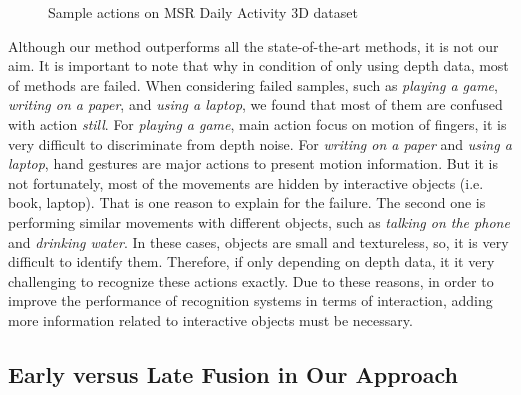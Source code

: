 \documentclass[review]{elsarticle}
\begin{document}
\begin{figure}
{        }
    \hfill
	\caption{\label{lbl:Figure_MSRDaily3D}Sample actions on MSR Daily Activity 3D dataset}
\end{figure}

Although our method outperforms all the state-of-the-art methods, it is not our aim. It is important to note that why in condition of only using depth data, most of methods are failed. When considering failed samples, such as \textit{playing a game}, \textit{writing on a paper}, and \textit{using a laptop}, we found that most of them are confused with action \textit{still}. For \textit{playing a game}, main action focus on motion of fingers, it is very difficult to discriminate from depth noise. For \textit{writing on a paper} and \textit{using a laptop}, hand gestures are major actions to present motion information. But it is not fortunately, most of the movements are hidden by interactive objects (i.e. book, laptop). That is one reason to explain for the failure. The second one is performing similar movements with different objects, such as \textit{talking on the phone} and \textit{drinking water}. In these cases, objects are small and textureless, so, it is very difficult to identify them.  Therefore, if only depending on depth data, it it very challenging to recognize these actions exactly. Due to these reasons, in order to improve the performance of recognition systems in terms of interaction, adding more information related to interactive objects must be necessary.

\subsection{Early versus Late Fusion in Our Approach}
\end{document}
